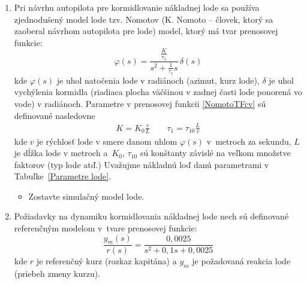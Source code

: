 \documentclass[a4paper, 10pt, ]{article}
\begin{document}
\begin{enumerate}[leftmargin=0pt, labelsep=4mm, itemsep=0pt]

    \item  Pri návrhu autopilota pre kormidlovanie nákladnej lode sa používa zjednodušený model lode tzv. Nomotov (K. Nomoto -- človek, ktorý sa zaoberal návrhom autopilota pre lode) model, ktorý má tvar prenosovej funkcie:
	\begin{equation} \label{NomotoTFcv}
		\varphi(s) = \frac{\frac{K}{\tau_1}}{s^2 + \frac{1}{\tau_1}s} \, \delta(s)
	\end{equation}
	kde $\varphi(s)$ je uhol natočenia lode v radiánoch (azimut, kurz lode), $\delta$ je uhol vychýlenia kormidla (riadiaca plocha väčšinou v zadnej časti lode ponorená vo vode) v radiánoch. Parametre v prenosovej funkcii \eqref{NomotoTFcv} sú definované nasledovne
	\begin{align*}
		K = K_0 \frac{v}{L} \qquad
		\tau_1 = \tau_{10} \frac{L}{v}
	\end{align*}
	kde $v$ je rýchlosť lode v smere danom uhlom $\varphi(s)$ v~metroch za sekundu, $L$ je dĺžka lode v metroch a~$K_0$, $\tau_{10}$ sú konštanty závislé na veľkom množstve faktorov (typ lode atď.) Uvažujme nákladnú loď danú parametrami v Tabuľke~\ref{Parametre lode}.

	\begin{itemize}[leftmargin=0pt, labelsep=4mm, itemsep=0pt]
		\item Zostavte simulačný model lode.
	\end{itemize}   
    
    
    \item Požiadavky na dynamiku kormidlovania nákladnej lode nech sú definované referenčným modelom v~tvare prenosovej funkcie:
	\begin{equation}
		\frac{y_m(s)}{r(s)} = \frac{0,0025 }{s^2 + 0,1 s + 0,0025}
	\end{equation}
	kde $r$ je referenčný kurz (rozkaz kapitána) a $y_m$ je požadovaná reakcia lode (priebeh zmeny kurzu).


\end{enumerate}
\end{document}
